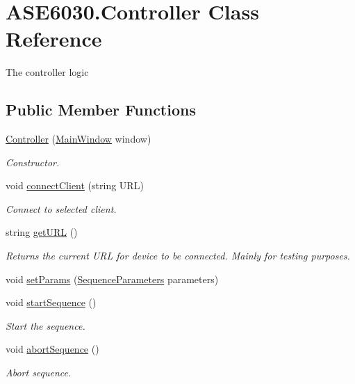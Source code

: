 \hypertarget{class_a_s_e6030_1_1_controller}{}\section{A\+S\+E6030.\+Controller Class Reference}
\label{class_a_s_e6030_1_1_controller}


The controller logic  


\subsection*{Public Member Functions}
\begin{DoxyCompactItemize}
\item 
\hyperlink{class_a_s_e6030_1_1_controller_aa7df468c34d983c6efe88f12abeffb79}{Controller} (\hyperlink{class_a_s_e6030_1_1_main_window}{Main\+Window} window)
\begin{DoxyCompactList}\small\item\em Constructor. \end{DoxyCompactList}\item 
void \hyperlink{class_a_s_e6030_1_1_controller_a5f84e69b4885c561df4bc177fcc54d40}{connect\+Client} (string U\+RL)
\begin{DoxyCompactList}\small\item\em Connect to selected client. \end{DoxyCompactList}\item 
\mbox{\label{class_a_s_e6030_1_1_controller_add4e6755696e2d0525bbb9fb8a5c8155}} 
string \hyperlink{class_a_s_e6030_1_1_controller_add4e6755696e2d0525bbb9fb8a5c8155}{get\+U\+RL} ()
\begin{DoxyCompactList}\small\item\em Returns the current U\+RL for device to be connected. Mainly for testing purposes. \end{DoxyCompactList}\item 
void \hyperlink{class_a_s_e6030_1_1_controller_afee09ba01da47aa772ce3da642e08e47}{set\+Params} (\hyperlink{class_a_s_e6030_1_1_sequence_parameters}{Sequence\+Parameters} parameters)
\item 
void \hyperlink{class_a_s_e6030_1_1_controller_afca76c3628ed37f21c1aac044a5e0441}{start\+Sequence} ()
\begin{DoxyCompactList}\small\item\em Start the sequence. \end{DoxyCompactList}\item 
void \hyperlink{class_a_s_e6030_1_1_controller_a1fa113ab02226c2d8a678365a749e3b0}{abort\+Sequence} ()
\begin{DoxyCompactList}\small\item\em Abort sequence. \end{DoxyCompactList}\end{DoxyCompactItemize}
